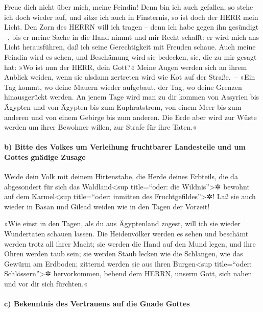 Freue dich nicht über mich, meine Feindin! Denn bin ich
auch gefallen, so stehe ich doch wieder auf, und sitze ich auch in
Finsternis, so ist doch der HERR mein Licht. Den Zorn des
HERRN will ich tragen -- denn ich habe gegen ihn gesündigt --, bis er
meine Sache in die Hand nimmt und mir Recht schafft: er wird mich ans
Licht herausführen, daß ich seine Gerechtigkeit mit Freuden schaue.
Auch meine Feindin wird es sehen, und Beschämung wird sie
bedecken, sie, die zu mir gesagt hat: »Wo ist nun der HERR, dein Gott?«
Meine Augen werden sich an ihrem Anblick weiden, wenn sie alsdann
zertreten wird wie Kot auf der Straße.~-- »Ein Tag kommt,
wo deine Mauern wieder aufgebaut, der Tag, wo deine Grenzen
hinausgerückt werden. An jenem Tage wird man zu dir
kommen von Assyrien bis Ägypten und von Ägypten bis zum Euphratstrom,
von einem Meer bis zum anderen und von einem Gebirge bis zum anderen.
Die Erde aber wird zur Wüste werden um ihrer Bewohner
willen, zur Strafe für ihre Taten.«

\hypertarget{b-bitte-des-volkes-um-verleihung-fruchtbarer-landesteile-und-um-gottes-gnuxe4dige-zusage}{%
\paragraph{b) Bitte des Volkes um Verleihung fruchtbarer Landesteile und
um Gottes gnädige
Zusage}\label{b-bitte-des-volkes-um-verleihung-fruchtbarer-landesteile-und-um-gottes-gnuxe4dige-zusage}}

Weide dein Volk mit deinem Hirtenstabe, die Herde deines
Erbteils, die da abgesondert für sich das Waldland\textless sup
title=``oder: die Wildnis''\textgreater✲ bewohnt auf dem
Karmel\textless sup title=``oder: inmitten des
Fruchtgefildes''\textgreater✲! Laß sie auch wieder in Basan und Gilead
weiden wie in den Tagen der Vorzeit!

»Wie einst in den Tagen, als du aus Ägyptenland zogest,
will ich sie wieder Wundertaten schauen lassen. Die
Heidenvölker werden es sehen und beschämt werden trotz all ihrer Macht;
sie werden die Hand auf den Mund legen, und ihre Ohren werden taub sein;
sie werden Staub lecken wie die Schlangen, wie das Gewürm
am Erdboden; zitternd werden sie aus ihren Burgen\textless sup
title=``oder: Schlössern''\textgreater✲ hervorkommen, bebend dem HERRN,
unserm Gott, sich nahen und vor dir sich fürchten.«

\hypertarget{c-bekenntnis-des-vertrauens-auf-die-gnade-gottes}{%
\paragraph{c) Bekenntnis des Vertrauens auf die Gnade
Gottes}\label{c-bekenntnis-des-vertrauens-auf-die-gnade-gottes}}

